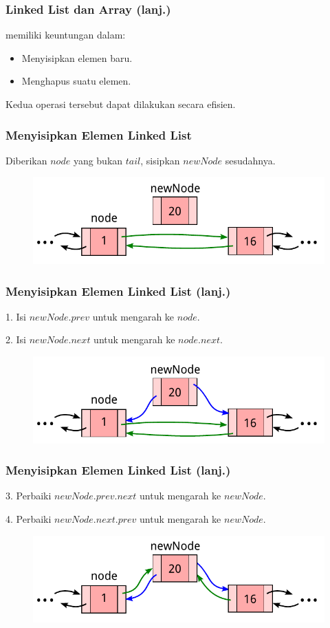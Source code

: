 \begin{frame}
\frametitle{Linked List dan Array (lanj.)}
 memiliki keuntungan dalam:
\begin{itemize}
  \item Menyisipkan elemen baru.
  \item Menghapus suatu elemen.
  \newline
\end{itemize}
Kedua operasi tersebut dapat dilakukan secara efisien.
\end{frame}

\begin{frame}
\frametitle{Menyisipkan Elemen Linked List}
Diberikan $node$ yang bukan $tail$, sisipkan $newNode$ sesudahnya.
\begin{figure}
  \centering
  \includegraphics[width=9 cm]{asset/doubly-insert-1.pdf}
\end{figure}
\end{frame}

\begin{frame}
\frametitle{Menyisipkan Elemen Linked List (lanj.)}
1. Isi  $newNode.prev$ untuk mengarah ke $node$.

2. Isi  $newNode.next$ untuk mengarah ke $node.next$.
\begin{figure}
  \centering
  \includegraphics[width=9 cm]{asset/doubly-insert-2.pdf}
\end{figure}
\end{frame}

\begin{frame}
\frametitle{Menyisipkan Elemen Linked List (lanj.)}
3. Perbaiki  $newNode.prev.next$ untuk mengarah ke $newNode$.

4. Perbaiki  $newNode.next.prev$ untuk mengarah ke $newNode$.
\begin{figure}
  \centering
  \includegraphics[width=9 cm]{asset/doubly-insert-3.pdf}
\end{figure}
\end{frame}

